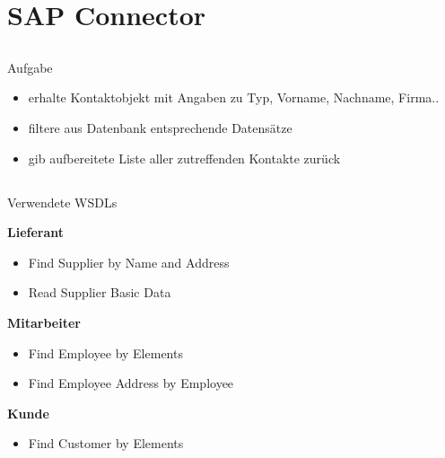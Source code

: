 \documentclass[xcolor={usenames,dvipsnames}, compress, 10pt]{beamer}
\begin{document}


\section{SAP Connector}

\subsection*{}

\begin{frame}{Aufgabe}
\begin{center}

\begin{itemize}
\item erhalte Kontaktobjekt mit Angaben zu Typ, Vorname, Nachname, Firma..
\item filtere aus Datenbank entsprechende Datensätze
\item gib aufbereitete Liste aller zutreffenden Kontakte zurück
\end{itemize}

\end{center}
\end{frame}

\subsection*{}

\begin{frame}{Verwendete WSDLs}

\textbf{Lieferant}
\begin{itemize}
\item Find Supplier by Name and Address
\item Read Supplier Basic Data 
\end{itemize}

\textbf{Mitarbeiter}
\begin{itemize}
\item Find Employee by Elements
\item Find Employee Address by Employee
\end{itemize}

\textbf{Kunde}
\begin{itemize}
\item Find Customer by Elements
\end{itemize}

\end{frame}

\subsection*{}
\end{document}
